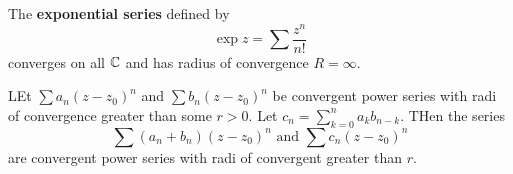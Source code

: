\begin{example}\label{example_3.2}
    The \textbf{exponential series} defined by
    \begin{equation*}
        \exp{z}=\sum{\frac{z^n}{n!}}
    \end{equation*}
    converges on all $\mathbb{C}$ and has radius of convergence  $R=\infty$.
\end{example}

\begin{lemma}\label{3.1.4}
    LEt $\sum{a_n(z-z_0)^n}$ and $\sum{b_n(z-z_0)^n}$ be convergent power series
    with radi of convergence  greater than some $r>0$. Let
    $c_n=\sum_{k=0}^n{a_kb_{n-k}}$. THen the series
    \begin{equation*}
        \sum{(a_n+b_n)(z-z_0)^n} \text{ and } \sum{c_n(z-z_0)^n}
    \end{equation*}
    are convergent power series with radi of convergent greater than $r$.
\end{lemma}
